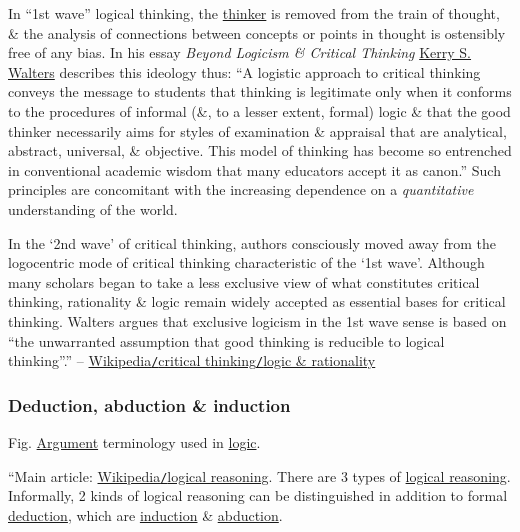 \documentclass[oneside]{book}
\numberwithin{equation}{section}
\begin{document}
In ``1st wave'' logical thinking, the \href{https://en.wikipedia.org/wiki/Thought}{thinker} is removed from the train of thought, \& the analysis of connections between concepts or points in thought is ostensibly free of any bias. In his essay \textit{Beyond Logicism \& Critical Thinking} \href{https://en.wikipedia.org/wiki/Kerry_S._Walters}{Kerry S. Walters} describes this ideology thus: ``A logistic approach to critical thinking conveys the message to students that thinking is legitimate only when it conforms to the procedures of informal (\&, to a lesser extent, formal) logic \& that the good thinker necessarily aims for styles of examination \& appraisal that are analytical, abstract, universal, \& objective. This model of thinking has become so entrenched in conventional academic wisdom that many educators accept it as canon.'' Such principles are concomitant with the increasing dependence on a \textit{quantitative} understanding of the world.

In the `2nd wave' of critical thinking, authors consciously moved away from the logocentric mode of critical thinking characteristic of the `1st wave'. Although many scholars began to take a less exclusive view of what constitutes critical thinking, rationality \& logic remain widely accepted as essential bases for critical thinking. Walters argues that exclusive logicism in the 1st wave sense is based on ``the unwarranted assumption that good thinking is reducible to logical thinking''.'' -- \href{https://en.wikipedia.org/wiki/Critical_thinking#Logic_and_rationality}{Wikipedia\texttt{/}critical thinking\texttt{/}logic \& rationality}

\subsubsection{Deduction, abduction \& induction}
\textsf{Fig. \href{https://en.wikipedia.org/wiki/Argument}{Argument} terminology used in \href{https://en.wikipedia.org/wiki/Logic}{logic}.}

``Main article: \href{https://en.wikipedia.org/wiki/Logical_reasoning}{Wikipedia\texttt{/}logical reasoning}. There are 3 types of \href{https://en.wikipedia.org/wiki/Logical_reasoning}{logical reasoning}. Informally, 2 kinds of logical reasoning can be distinguished in addition to formal \href{https://en.wikipedia.org/wiki/Deductive_reasoning}{deduction}, which are \href{https://en.wikipedia.org/wiki/Inductive_reasoning}{induction} \& \href{https://en.wikipedia.org/wiki/Abductive_reasoning}{abduction}.
\end{document}

